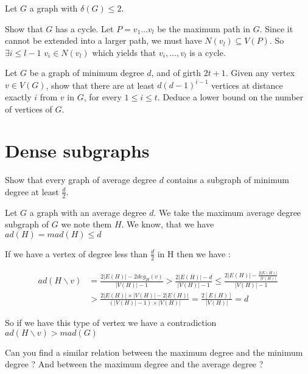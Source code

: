 \documentclass{article}
\theoremstyle{plain}
\begin{document}
  \begin{correction}{}{}
    Let $G$ a graph with $\delta(G) \leq 2$.

    Show that $G$ has a cycle. Let $P = v_1 \ldots v_l$ be the maximum path in
    $G$. Since it cannot be extended into a larger path, we must have $N(v_l)
    \subseteq V(P)$. So $\exists i \leq l-1$ $v_i \in N(v_l)$ which yields that
    $v_i, \ldots , v_l$ is a cycle.
  \end{correction}

  \exercice Let $G$ be a graph of minimum degree $d$, and of girth $2t+1$. Given
  any vertex $v \in V(G)$, show that there are at least $d(d-1)^{i-1}$ vertices
  at distance exactly $i$ from $v$ in $G$, for every $1 \leq i \leq t$. Deduce a
  lower bound on the number of vertices of $G$.

  \begin{correction}{}{}
  \end{correction}


  \section{Dense subgraphs}

  \exercice Show that every graph of average degree $d$ contains a subgraph of
  minimum degree at least $\frac d 2$.

  \begin{correction}{}{}
    Let $G$ a graph with an average degree $d$. We take the maximum average
    degree subgraph of $G$ we note them $H$. We know, that we have $ad(H) =
    mad(H) \leq d$

    If we have a vertex of degree less than $\frac d 2$ in H then we have :

    \begin{align*}
      ad(H \backslash v) &= \frac{2|E(H)| - 2 deg_H(v)}{|V(H)| - 1} >
      \frac{2|E(H)| - d}{|V(H)| - 1} \leq \frac{2|E(H)| -
      \frac{2|E(H)|}{|V(H)|}}{|V(H)| - 1} \\
      &> \frac{2|E(H)| \times |V(H)| - 2|E(H)|}{(|V(H)| - 1) \times |V(H)|}
      = \frac{2[E(H)]}{|V(H)|} = d
    \end{align*}

    So if we have this type of vertex we have a contradiction $ad(H \backslash
    v) > mad(G)$
  \end{correction}

  \exercice Can you find a similar relation between the maximum degree and the
  minimum degree ? And between the maximum degree and the average degree ?
\end{document}
